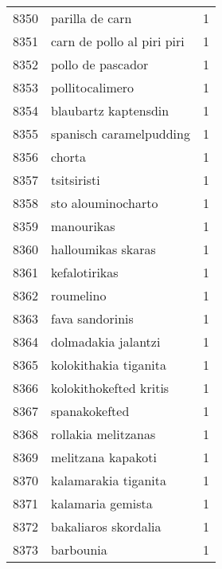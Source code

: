 \begin{tabular}{llr}
8350 &                                    parilla de carn &      1 \\
8351 &                         carn de pollo al piri piri &      1 \\
8352 &                                  pollo de pascador &      1 \\
8353 &                                    pollitocalimero &      1 \\
8354 &                               blaubartz kaptensdin &      1 \\
8355 &                            spanisch caramelpudding &      1 \\
8356 &                                             chorta &      1 \\
8357 &                                        tsitsiristi &      1 \\
8358 &                                 sto alouminocharto &      1 \\
8359 &                                         manourikas &      1 \\
8360 &                                 halloumikas skaras &      1 \\
8361 &                                      kefalotirikas &      1 \\
8362 &                                          roumelino &      1 \\
8363 &                                    fava sandorinis &      1 \\
8364 &                                dolmadakia jalantzi &      1 \\
8365 &                              kolokithakia tiganita &      1 \\
8366 &                             kolokithokefted kritis &      1 \\
8367 &                                      spanakokefted &      1 \\
8368 &                                rollakia melitzanas &      1 \\
8369 &                                 melitzana kapakoti &      1 \\
8370 &                               kalamarakia tiganita &      1 \\
8371 &                                  kalamaria gemista &      1 \\
8372 &                               bakaliaros skordalia &      1 \\
8373 &                                          barbounia &      1 \\

\end{tabular}
